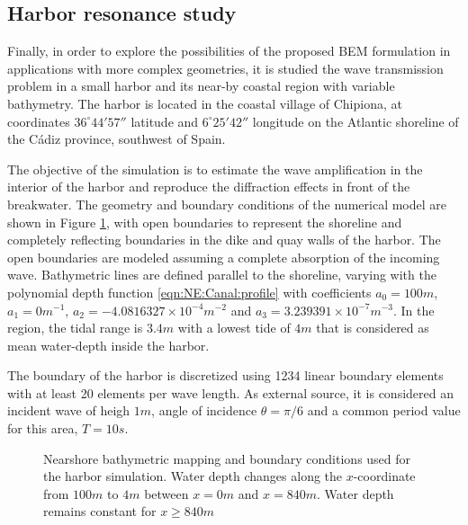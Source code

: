 \subsection{Harbor resonance study}
\label{SUBSECTION: NE CHIPIONA HARBOUR}
Finally, in order to explore the possibilities of the proposed BEM formulation in applications with more complex geometries, it is studied the wave transmission problem in a small harbor and its near-by coastal region with variable bathymetry. The harbor is located in the coastal village of Chipiona, at coordinates $36^\circ 44'57''$ latitude and $6^\circ 25'42''$ longitude on the Atlantic shoreline of the C\'{a}diz province, southwest of Spain.

The objective of the simulation is to estimate the wave amplification in the interior of the harbor and reproduce the diffraction effects in front of the breakwater. The geometry and boundary conditions of the numerical model are shown in Figure \ref{fig:HARBOUR_SCHEME}, with open boundaries to represent the shoreline and completely reflecting boundaries in the dike and quay walls of the harbor. The open boundaries are modeled assuming a complete absorption of the incoming wave. Bathymetric lines are defined parallel to the shoreline, varying with the polynomial depth function \eqref{eqn:NE:Canal:profile} with coefficients $a_0=100m$, $a_1=0m^{-1}$, $a_2=-4.0816327 \times 10^{-4}m^{-2}$ and $a_3=3.239391 \times 10^{-7}m^{-3}$. In the region, the tidal range is $3.4m$ with a lowest tide of $4m$ that is considered as mean water-depth inside the harbor.

The boundary of the harbor is discretized using 1234 linear boundary elements with at least 20 elements per wave length. As external source, it is considered an incident wave of heigh $1 m$, angle of incidence $\theta=\pi/6$ and a common period value for this area, $T=10s$.

\begin{figure}
\centering
\def\svgwidth{0.8\columnwidth}

\caption{Nearshore bathymetric mapping and boundary conditions used for the harbor simulation. Water depth changes along the $x$-coordinate from $100 m$ to $4 m$ between $x=0m$ and $x=840m$. Water depth remains constant for $x \geq 840m$}
\label{fig:HARBOUR_SCHEME}
\end{figure}

